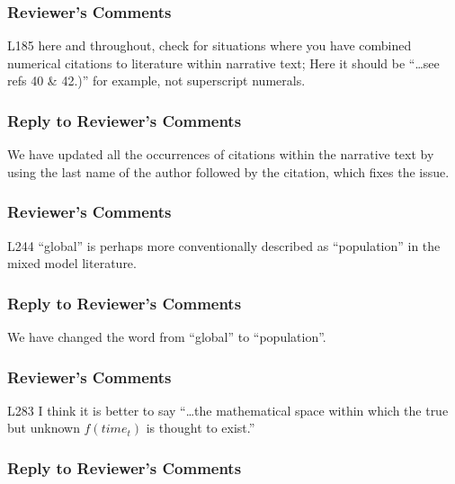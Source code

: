 \documentclass[
]{article}
\begin{document}
\hypertarget{reviewers-comments-20}{%
\subsubsection{Reviewer's Comments}\label{reviewers-comments-20}}

L185 here and throughout, check for situations where you have combined numerical citations to literature within narrative text; Here it should be ``\ldots see refs 40 \& 42.)'' for example, not superscript numerals.

\hypertarget{section-21}{%
\subsubsection{\texorpdfstring{\textcolor{reviewersblue} {Reply to Reviewer's Comments}}{}}\label{section-21}}

We have updated all the occurrences of citations within the narrative text by using the last name of the author followed by the citation, which fixes the issue.

\hypertarget{reviewers-comments-21}{%
\subsubsection{Reviewer's Comments}\label{reviewers-comments-21}}

L244 ``global'' is perhaps more conventionally described as ``population'' in the mixed model literature.

\hypertarget{section-22}{%
\subsubsection{\texorpdfstring{\textcolor{reviewersblue} {Reply to Reviewer's Comments}}{}}\label{section-22}}

We have changed the word from ``global'' to ``population''.

\hypertarget{reviewers-comments-22}{%
\subsubsection{Reviewer's Comments}\label{reviewers-comments-22}}

L283 I think it is better to say ``\ldots the mathematical space within which the true but unknown \(f(time_t)\) is thought to exist.''

\hypertarget{section-23}{%
\subsubsection{\texorpdfstring{\textcolor{reviewersblue} {Reply to Reviewer's Comments}}{}}\label{section-23}}
\end{document}
